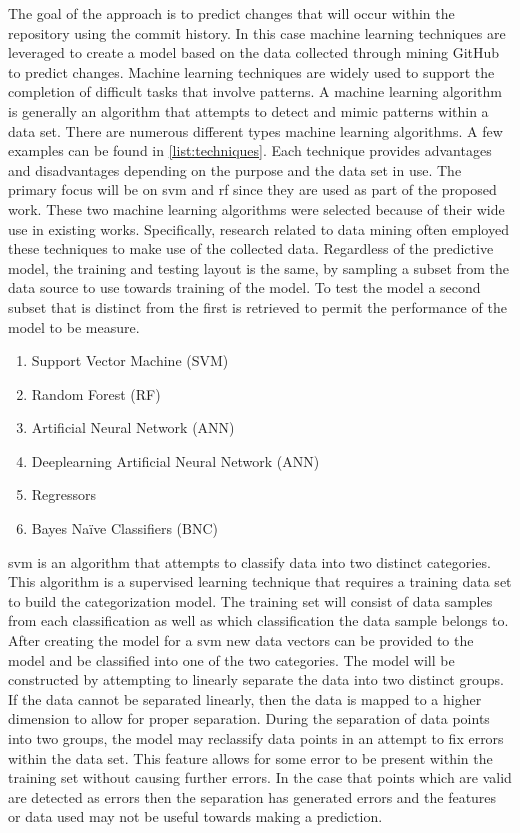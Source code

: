 The goal of the approach is to predict changes that will occur within the repository using the commit history. In this case machine learning techniques are leveraged to create a model based on the data collected through mining GitHub to predict changes. Machine learning techniques are widely used to support the completion of difficult tasks that involve patterns. A machine learning algorithm is generally an algorithm that attempts to detect and mimic patterns within a data set. There are numerous different types machine learning algorithms. A few examples can be found in \autoref{list:techniques}. Each technique provides advantages and disadvantages depending on the purpose and the data set in use. The primary focus will be on \gls{svm} and \gls{rf} since they are used as part of the proposed work. These two machine learning algorithms were selected because of their wide use in existing works. Specifically, research related to data mining often employed these techniques to make use of the collected data. Regardless of the predictive model, the training and testing layout is the same, by sampling a subset from the data source to use towards training of the model. To test the model a second subset that is distinct from the first is retrieved to permit the performance of the model to be measure.

\begin{enumerate}
\item Support Vector Machine (SVM)
\item Random Forest (RF)
\item Artificial Neural Network (ANN)
\item Deeplearning Artificial Neural Network (ANN)
\item Regressors
\item Bayes Na{\"i}ve Classifiers (BNC)
\label{list:techniques}
\end{enumerate}


\gls{svm} is an algorithm that attempts to classify data into two distinct categories. This algorithm is a supervised learning technique that requires a training data set to build the categorization model. The training set will consist of data samples from each classification as well as which classification the data sample belongs to. After creating the model for a \gls{svm} new data vectors can be provided to the model and be classified into one of the two categories. The model will be constructed by attempting to linearly separate the data into two distinct groups. If the data cannot be separated linearly, then the data is mapped to a higher dimension to allow for proper separation. During the separation of data points into two groups, the model may reclassify data points in an attempt to fix errors within the data set. This feature allows for some error to be present within the training set without causing further errors. In the case that points which are valid are detected as errors then the separation has generated errors and the features or data used may not be useful towards making a prediction.%

